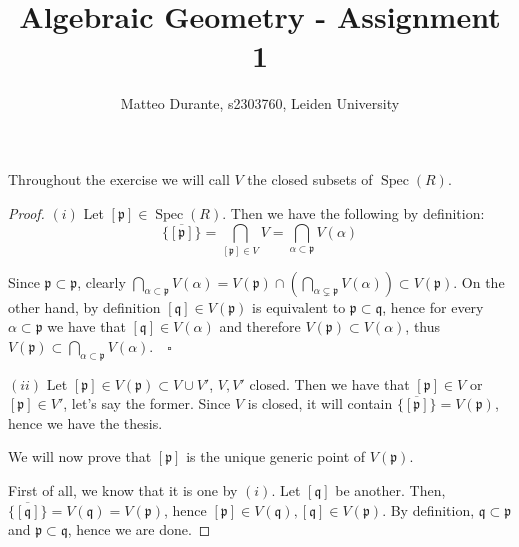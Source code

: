 \documentclass{article}
\newcommand{\pid}{\mathfrak{p}}
\newcommand{\qid}{\mathfrak{q}}
\newcommand{\exercise}[1]{\noindent {\bf Exercise #1}}
\DeclareMathOperator{\Spec}{Spec}
\begin{document}
\title{Algebraic Geometry - Assignment 1}

\author{Matteo Durante, s2303760, Leiden University}

\maketitle

\exercise{1}

Throughout the exercise we will call $V$ the closed subsets of $\Spec(R)$.

\begin{proof}
$(i)$ Let $[\pid]\in\Spec(R)$. Then we have the following by definition:
$$\overline{\{[\pid]\}}=\bigcap_{[\pid]\in V} V=\bigcap_{\alpha\subset\pid}
V(\alpha)$$

Since $\pid\subset\pid$, clearly $\bigcap_{\alpha\subset\pid}
V(\alpha)=V(\pid)\cap (\bigcap_{\alpha\subsetneq\pid} V(\alpha))\subset
V(\pid)$. On the other hand, by definition $[\qid]\in V(\pid)$ is equivalent to
$\pid\subset\qid$, hence for every $\alpha\subset\pid$ we have that $[\qid]\in
V(\alpha)$ and therefore $V(\pid)\subset V(\alpha)$, thus
$V(\pid)\subset\bigcap_{\alpha\subset\pid} V(\alpha)$.$\quad\square$

\proof $(ii)$ Let $[\pid]\in V(\pid)\subset V\cup V'$, $V,V'$ closed. Then we
have that $[\pid]\in V$ or $[\pid]\in V'$, let's say the former. Since $V$ is
closed, it will contain $\overline{\{[\pid]\}}=V(\pid)$, hence we have the
thesis.

We will now prove that $[\pid]$ is the unique generic point of $V(\pid)$.

First of all, we know that it is one by $(i)$. Let $[\qid]$ be another. Then,
$\overline{\{[\qid]\}}=V(\qid)=V(\pid)$, hence $[\pid]\in V(\qid),[\qid]\in
V(\pid)$. By definition, $\qid\subset\pid$ and $\pid\subset\qid$, hence we are
done.
\end{proof}
\end{document}
